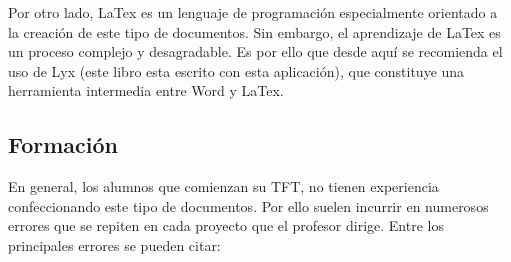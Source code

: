 \documentclass[12pt,spanish,chapterprefix, numbers=noenddot]{book}
\numberwithin{equation}{section}
\numberwithin{figure}{section}
\begin{document}
    Por otro lado, LaTex es un lenguaje de programación
    especialmente orientado a la creación de este tipo de documentos.
    Sin embargo, el aprendizaje de LaTex es un proceso complejo y desagradable.
    Es por ello que desde aquí se recomienda el uso de Lyx (este libro
    esta escrito con esta aplicación), que constituye una herramienta
    intermedia entre Word y LaTex.

    \subsection{Formación}

    En general, los alumnos que comienzan su TFT, no tienen experiencia
    confeccionando este tipo de documentos. Por ello suelen incurrir en
    numerosos errores que se repiten en cada proyecto que el profesor
    dirige. Entre los principales errores se pueden citar:
\end{document}

